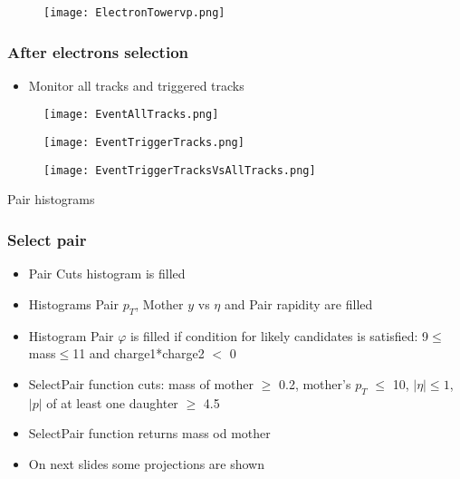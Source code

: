 \documentclass{beamer}
\begin{document}
\begin{frame}
  \begin{figure}[h!]
  \centering
  \texttt{[image: ElectronTowervp.png]}
  \end{figure}
\end{frame}

\begin{frame}
	\frametitle{After electrons selection}
	\begin{itemize}
		\item Monitor all tracks and triggered tracks 
	\end{itemize}
\end{frame}

\begin{frame}
	\begin{figure}[h!]
		\centering
		\texttt{[image: EventAllTracks.png]}
	\end{figure}
\end{frame}

\begin{frame}
	\begin{figure}[h!]
		\centering
		\texttt{[image: EventTriggerTracks.png]}
	\end{figure}
\end{frame}

\begin{frame}
	\begin{figure}[h!]
		\centering
		\texttt{[image: EventTriggerTracksVsAllTracks.png]}
	\end{figure}
\end{frame}

\begin{frame}
  \begin{center}
 	\Huge Pair histograms
 	\end{center}
\end{frame}

\begin{frame}
  \frametitle{Select pair}
  \begin{itemize}
    \item Pair Cuts histogram is filled
    \item Histograms Pair $p_T$, Mother $y$ vs $\eta$ and Pair rapidity are filled
    \item Histogram Pair $\varphi$ is filled if condition for likely candidates is satisfied: 9$\leq$mass$\leq$11 and charge1*charge2 $<$ 0 
    \item SelectPair function cuts: mass of mother $\geq$ 0.2, mother's $p_T$ $\leq$ 10, $|\eta|\leq1$, $|p|$ of at least one daughter $\geq$ 4.5
    \item SelectPair function returns mass od mother
    \item On next slides some projections are shown
  \end{itemize}
\end{frame}
\end{document}
